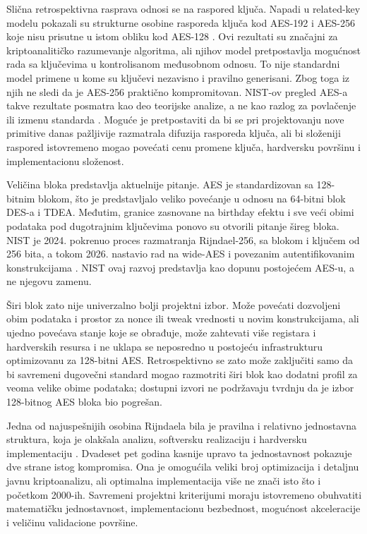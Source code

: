 Slična retrospektivna rasprava odnosi se na raspored ključa. Napadi u
related-key modelu pokazali su strukturne osobine rasporeda ključa kod
AES-192 i AES-256 koje nisu prisutne u istom obliku kod AES-128
\cite{BiryukovKhovratovich2009AES}. Ovi rezultati su značajni za
kriptoanalitičko razumevanje algoritma, ali njihov model pretpostavlja
mogućnost rada sa ključevima u kontrolisanom međusobnom odnosu. To nije
standardni model primene u kome su ključevi nezavisno i pravilno
generisani. Zbog toga iz njih ne sledi da je AES-256 praktično kompromitovan.
NIST-ov pregled AES-a takve rezultate posmatra kao deo teorijske analize,
a ne kao razlog za povlačenje ili izmenu standarda
\cite{MouhaDworkin2021AESReview}. Moguće je pretpostaviti da bi se pri
projektovanju nove primitive danas pažljivije razmatrala difuzija rasporeda
ključa, ali bi složeniji raspored istovremeno mogao povećati cenu promene
ključa, hardversku površinu i implementacionu složenost.

Veličina bloka predstavlja aktuelnije pitanje. AES je standardizovan sa
128-bitnim blokom, što je predstavljalo veliko povećanje u odnosu na
64-bitni blok DES-a i TDEA. Međutim, granice zasnovane na birthday efektu
i sve veći obimi podataka pod dugotrajnim ključevima ponovo su otvorili
pitanje šireg bloka. NIST je 2024. pokrenuo proces razmatranja
Rijndael-256, sa blokom i ključem od 256 bita, a tokom 2026. nastavio
rad na wide-AES i povezanim autentifikovanim konstrukcijama
\cite{NISTWideAES2024,Turan2026SymmetricStandards}. NIST ovaj razvoj
predstavlja kao dopunu postojećem AES-u, a ne njegovu zamenu.

Širi blok zato nije univerzalno bolji projektni izbor. Može povećati
dozvoljeni obim podataka i prostor za nonce ili tweak vrednosti u novim
konstrukcijama, ali ujedno povećava stanje koje se obrađuje, može zahtevati
više registara i hardverskih resursa i ne uklapa se neposredno u postojeću
infrastrukturu optimizovanu za 128-bitni AES. Retrospektivno se zato može
zaključiti samo da bi savremeni dugovečni standard mogao razmotriti širi
blok kao dodatni profil za veoma velike obime podataka; dostupni izvori ne
podržavaju tvrdnju da je izbor 128-bitnog AES bloka bio pogrešan.

Jedna od najuspešnijih osobina Rijndaela bila je pravilna i relativno
jednostavna struktura, koja je olakšala analizu, softversku realizaciju i
hardversku implementaciju \cite{NechvatalEtAl2001AESDevelopment,
DaemenRijmen2002}. Dvadeset pet godina kasnije upravo ta jednostavnost
pokazuje dve strane istog kompromisa. Ona je omogućila veliki broj
optimizacija i detaljnu javnu kriptoanalizu, ali optimalna implementacija
više ne znači isto što i početkom 2000-ih. Savremeni projektni kriterijumi
moraju istovremeno obuhvatiti matematičku jednostavnost, implementacionu
bezbednost, mogućnost akceleracije i veličinu validacione površine.


